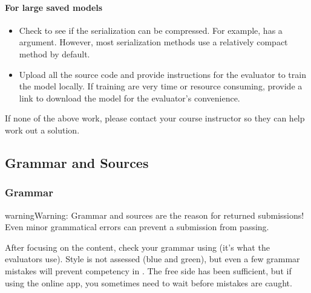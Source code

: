 \documentclass[letterpaper,10pt,english]{jupyterBook}
\begin{document}
\paragraph{For large saved models}
\label{\detokenize{task2_doc/task2_doc_finish:for-large-saved-models}}\begin{itemize}
\item {} 
\sphinxAtStartPar
Check to see if the serialization can be compressed. For example,  has a  argument. However, most serialization methods use a relatively compact method by default.

\item {} 
\sphinxAtStartPar
Upload all the source code and provide instructions for the evaluator to train the model locally. If training are very time or resource consuming, provide a link to download the model for the evaluator’s convenience.

\end{itemize}

\sphinxAtStartPar
If none of the above work, please contact your course instructor so they can help work out a solution.


\subsection{Grammar and Sources}
\label{\detokenize{task2_doc/task2_doc_finish:grammar-and-sources}}

\subsubsection{Grammar}
\label{\detokenize{task2_doc/task2_doc_finish:grammar}}\label{\detokenize{task2_doc/task2_doc_finish:task2-doc-finish-grammar}}
\begin{sphinxadmonition}{warning}{Warning:}
\sphinxAtStartPar
Grammar and sources are the  reason for returned submissions! Even minor grammatical errors can prevent a submission from passing.
\end{sphinxadmonition}

\sphinxAtStartPar
After focusing on the content, check your grammar using   (it’s what the evaluators use). Style is not assessed (blue and green), but even a few grammar mistakes will prevent competency in . The free side has been sufficient, but if using the online app, you sometimes need to wait before mistakes are caught.
\end{document}
